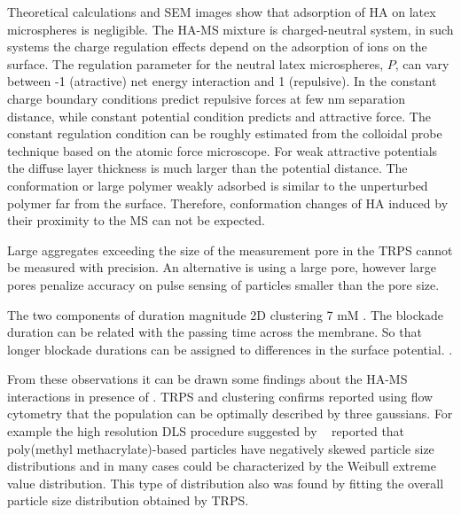 \documentclass[journal=langd5,manuscript=article]{achemso}
\begin{document}
Theoretical calculations and SEM images show that adsorption of  HA on latex microspheres is negligible.
The HA-MS mixture is charged-neutral system, in such systems the charge regulation effects depend on the adsorption of ions on the surface.
The regulation
parameter for the neutral latex microspheres, $P$, can vary between -1
(atractive) net energy interaction and 1
 (repulsive).
In the constant charge boundary conditions predict  repulsive forces at few nm separation distance, while constant potential condition predicts and attractive force\cite{Trefalt2014}.
The constant regulation condition can be roughly estimated from the  colloidal probe technique based on the atomic force microscope\cite{Ruiz-Cabello2013}.
For weak attractive potentials the diffuse layer thickness
is much larger than the potential distance. The conformation or large  polymer weakly adsorbed is similar to the unperturbed polymer far from the surface\cite{Netz2003}. Therefore, conformation changes of HA induced by their proximity to the MS can not be expected.

Large aggregates exceeding  the size of 
the measurement pore in the TRPS cannot be measured with precision. An alternative is using a  large pore, however large pores penalize accuracy on pulse sensing of particles smaller than the pore size.


The two components of duration magnitude 2D clustering
7 mM . 
The blockade duration can be related with the passing time across the membrane. So that longer blockade durations can be assigned to differences in the surface potential.
\citeauthor{Weatherall2016}
\citeyear{Weatherall2016}.




From these observations it can be drawn some findings  about the HA-MS interactions in presence of .
TRPS and clustering confirms reported using flow cytometry that the population can be optimally described by three gaussians.
 For example the  high resolution DLS procedure suggested by
 ~\citeauthor{Bryant2003AccurateSuspensions}\cite{Bryant2003AccurateSuspensions} 
reported  that poly(methyl methacrylate)-based particles have negatively
skewed particle size distributions and in many cases could be characterized
by the Weibull extreme value distribution. This type of distribution also
was found by fitting the overall particle size distribution obtained by TRPS.
\end{document}
